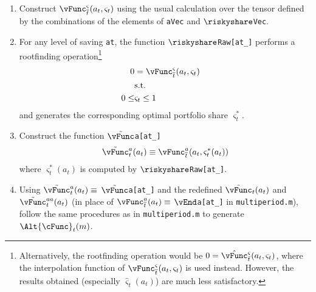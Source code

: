 \documentclass[titlepage, headings=optiontotocandhead]{\econtex}
\begin{document}
\begin{enumerate}

\item Construct
  $\vEOPt^{\varsigma}({a}_{t},\varsigma_{t})$ using the usual calculation
  over the tensor defined by the combinations of the elements of
  \texttt{aVec} and \texttt{$\riskyshare$Vec}.

\item For any level of saving \texttt{at}, the function \texttt{$\riskyshare$Raw[at\_]} performs a rootfinding
  operation\footnote{Alternatively, the rootfinding operation would be
    $0 = \hat{\vFunc}^{\varsigma}_{\bar{t}}({a}_{t},\varsigma_{t})$, where the
    interpolation function of $\vEOPt^{\varsigma}({a}_{t},\varsigma_{t})$ is
    used instead. However, the results obtained (especially
    $\hat{\varsigma}_{t}({a}_{t})$) are much less satisfactory.}
  \begin{equation}\begin{gathered}\begin{aligned}
        0  & = \vFunc^{\varsigma}_{\overline{t}}({a}_{t},\varsigma_{t})
        \\      & \text{s.t.} & \nonumber
        \\      0 \leq & \varsigma_{t}  \leq 1
      \end{aligned}\end{gathered}\end{equation}
  and generates the corresponding optimal portfolio share
  $\varsigma^{\ast}_{t}$.

\item Construct the function \texttt{$\Opt{\vFunc}$a[at\_]}
  \begin{equation}\begin{gathered}\begin{aligned}
        \Opt{\vFunc}_{t}^{a}({a}_{t}) \equiv
        \vEOPt^{a}({a}_{t},\varsigma^{\ast}_{t}({a}_{t}))
      \end{aligned}\end{gathered}\end{equation}
  where $\varsigma^{\ast}_{t}({a}_{t})$ is computed by \texttt{$\riskyshare$Raw[at\_]}.

\item Using $\Opt{\vFunc}_{t}^{a}({a}_{t}) \equiv$
  \texttt{$\Opt{\vFunc}$a[at\_]} and the redefined
  $\Opt{\vFunc}_{t}({a}_{t})$ and $\Opt{\vFunc}_{t}^{{aa}}({a}_{t})$ (in
  place of $\vEOPt^{a}({a}_{t}) \equiv $ \texttt{$\vEnd$a[at\_]} in
  \texttt{multiperiod.m}), follow the same procedures as in
  \texttt{multiperiod.m} to generate $\Alt{\cFunc}_{t}({m})$.

\end{enumerate}
\end{document}
